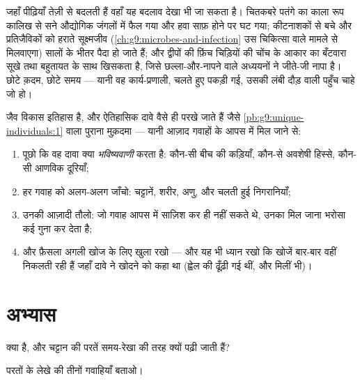 \begin{example}[उसे चलते हुए देखना]\label{ex:g9:evidence-of-evolution:live}
जहाँ पीढ़ियाँ तेज़ी से बदलती हैं वहाँ यह बदलाव देखा भी जा सकता है।
चितकबरे पतंगे का काला रूप कालिख से सने औद्योगिक जंगलों में फैल गया और
हवा साफ़ होने पर घट गया; कीटनाशकों से बचे  और प्रतिजैविकों को हराते
सूक्ष्मजीव (\cref{ch:g9:microbes-and-infection} उस चिकित्सा वाले मामले
से मिलवाएगा) सालों के भीतर पैदा हो जाते हैं; और द्वीपों की फ़िंच
चिड़ियों की चोंच के आकार का बँटवारा सूखे तथा बहुतायत के साथ खिसकता है,
जिसे छल्ला-और-नापने वाले अध्ययनों ने जीते-जी नापा है। छोटे क़दम, छोटे
समय --- यानी वह कार्य-प्रणाली, चलते हुए पकड़ी गई, उसकी लंबी दौड़ वाली
पहुँच चाहे जो हो।
\end{example}

\begin{method}[ऐतिहासिक सबूत तौलना]\label{met:g9:evidence-of-evolution:weigh}
जैव विकास इतिहास है, और ऐतिहासिक दावे वैसे ही परखे जाते हैं जैसे
\cref{pb:g9:unique-individuals:1} वाला पुराना मुक़दमा --- यानी आज़ाद
गवाहों के आपस में मिल जाने से:
\begin{enumerate}
  \item पूछो कि वह दावा क्या \emph{भविष्यवाणी} करता है: कौन-सी बीच की
        कड़ियाँ, कौन-से अवशेषी हिस्से, कौन-सी आणविक दूरियाँ;
  \item हर गवाह को अलग-अलग जाँचो: चट्टानें, शरीर, अणु, और चलती हुई
        निगरानियाँ;
  \item उनकी आज़ादी तौलो: जो गवाह आपस में साज़िश कर ही नहीं सकते थे,
        उनका मिल जाना भरोसा कई गुना कर देता है;
  \item और फ़ैसला अगली खोज के लिए खुला रखो --- और यह भी ध्यान रखो कि
        खोजें बार-बार वहीं निकलती रही हैं जहाँ दावे ने खोदने को कहा था
        (ह्वेल की  ढूँढ़ी गई थीं, और मिलीं भी)।
\end{enumerate}
\end{method}

\section{अभ्यास}

\begin{exercise}[$\star$]\label{exo:g9:evidence-of-evolution:1}
 क्या है, और चट्टान की परतें समय-रेखा की तरह क्यों पढ़ी जाती हैं?
\end{exercise}

\begin{exercise}[$\star$]\label{exo:g9:evidence-of-evolution:2}
परतों के लेखे की तीनों गवाहियाँ बताओ।
\end{exercise}

